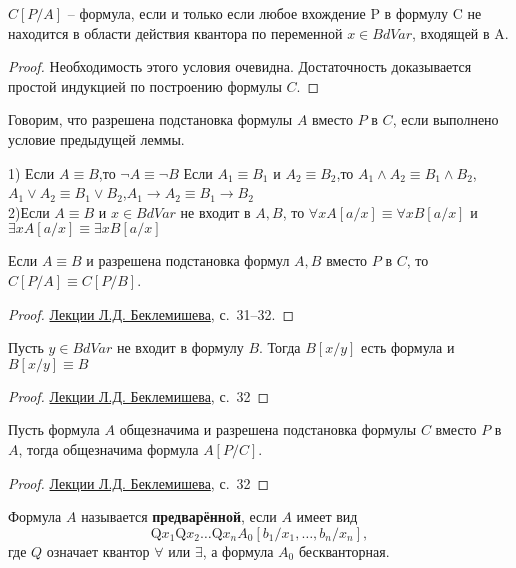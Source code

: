 \begin{lemma}
	$C[P/A]$ -- формула, если и только если любое вхождение P в формулу C не находится в области действия квантора
	по переменной $x\in BdVar$, входящей в A.
\end{lemma}
\begin{proof}
     Необходимость этого условия очевидна. Достаточность доказывается простой индукцией по построению формулы $C$.
\end{proof}
\begin{definition}
    Говорим, что разрешена подстановка формулы $A$ вместо $P$ в $C$, если выполнено условие предыдущей леммы.
\end{definition}
\begin{lemma}
	1) Если $A\equiv B$,то $\neg A \equiv \neg B$ Если $A_1\equiv B_1$ и $A_2\equiv B_2$,то $A_1\wedge A_2\equiv
	B_1 \wedge B_2$,$A_1\lor A_2\equiv B_1 \lor B_2$,$A_1\rightarrow A_2\equiv B_1 \rightarrow B_2$\\
	2)Если $A\equiv B$ и $x \in BdVar$ не входит в $A,B$, то $\forall x A[a / x] \equiv \forall x B[a / x]$ и
	$\exists x A[a / x] \equiv \exists x B[a / x]$
\end{lemma}
\begin{theorem}
	Если $A \equiv B$ и разрешена подстановка формул $A,B$ вместо $P$ в $C$, то $C[P/A]\equiv C[P/B]$.
\end{theorem}
\begin{proof}
	\href{http://lpcs.math.msu.su/vml2019/2019_VML_Beklemishev_2_Logic.pdf}{Лекции Л.Д. Беклемишева}, с.~31--32.
\end{proof}
\begin{lemma}
    Пусть $y\in BdVar$ не входит в формулу $B$. Тогда $B[x/y]$ есть формула и $B[x/y] \equiv B$
\end{lemma}
\begin{proof}
	\href{http://lpcs.math.msu.su/vml2019/2019_VML_Beklemishev_2_Logic.pdf}{Лекции Л.Д. Беклемишева}, с.~32
\end{proof}
\begin{theorem}
	Пусть формула $A$ общезначима и разрешена подстановка формулы $C$ вместо $P$ в $A$, тогда общезначима формула
	$A[P/C]$.
\end{theorem}
\begin{proof}
	\href{http://lpcs.math.msu.su/vml2019/2019_VML_Beklemishev_2_Logic.pdf}{Лекции Л.Д. Беклемишева}, с.~32
\end{proof}
\begin{definition}
	Формула $A$ называется \textbf{предварённой}, если $A$ имеет вид $$\mathrm{Q} x_{1} \mathrm{Q} x_{2} \ldots
	\mathrm{Q} x_{n} A_{0}\left[b_{1} / x_{1}, \ldots, b_{n} / x_{n}\right],$$где $Q$ означает квантор $\forall$ или
	$\exists$, а формула $A_0$ бескванторная.
\end{definition}
